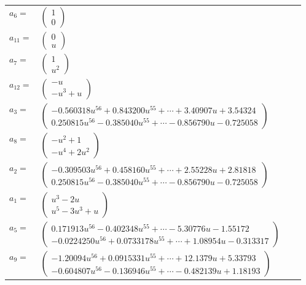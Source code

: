 \documentclass[1p]{elsarticle_modified}
\theoremstyle{definition}
\begin{document}
\begin{tabular}{m{7pt} m{180pt} m{7pt} m{180pt} }
\flushright $a_{6}=$&$\begin{pmatrix}1\\0\end{pmatrix}$ \\
\flushright $a_{11}=$&$\begin{pmatrix}0\\u\end{pmatrix}$ \\
\flushright $a_{7}=$&$\begin{pmatrix}1\\u^2\end{pmatrix}$ \\
\flushright $a_{12}=$&$\begin{pmatrix}- u\\- u^3+u\end{pmatrix}$ \\
\flushright $a_{3}=$&$\begin{pmatrix}-0.560318 u^{56}+0.843200 u^{55}+\cdots+3.40907 u+3.54324\\0.250815 u^{56}-0.385040 u^{55}+\cdots-0.856790 u-0.725058\end{pmatrix}$ \\
\flushright $a_{8}=$&$\begin{pmatrix}- u^2+1\\- u^4+2 u^2\end{pmatrix}$ \\
\flushright $a_{2}=$&$\begin{pmatrix}-0.309503 u^{56}+0.458160 u^{55}+\cdots+2.55228 u+2.81818\\0.250815 u^{56}-0.385040 u^{55}+\cdots-0.856790 u-0.725058\end{pmatrix}$ \\
\flushright $a_{1}=$&$\begin{pmatrix}u^3-2 u\\u^5-3 u^3+u\end{pmatrix}$ \\
\flushright $a_{5}=$&$\begin{pmatrix}0.171913 u^{56}-0.402348 u^{55}+\cdots-5.30776 u-1.55172\\-0.0224250 u^{56}+0.0733178 u^{55}+\cdots+1.08954 u-0.313317\end{pmatrix}$ \\
\flushright $a_{9}=$&$\begin{pmatrix}-1.20094 u^{56}+0.0915331 u^{55}+\cdots+12.1379 u+5.33793\\-0.604807 u^{56}-0.136946 u^{55}+\cdots-0.482139 u+1.18193\end{pmatrix}$ \\

\end{tabular}
\end{document}
